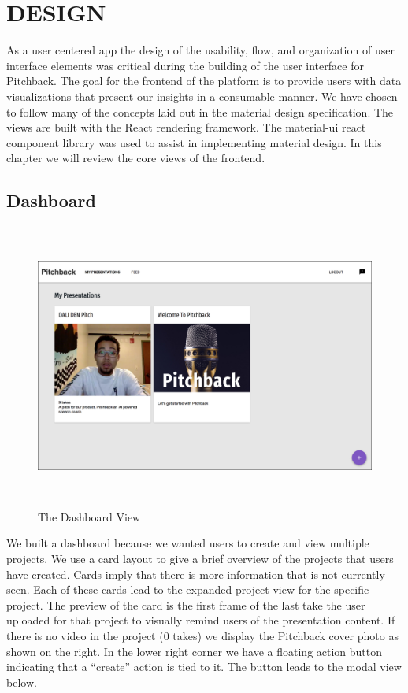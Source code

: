 \section*{DESIGN} \label{chapterdesign}

As a user centered app the design of the usability, flow, and organization of
user interface elements was critical during the building of the user interface
for Pitchback. The goal for the frontend of the platform is to provide users
with data visualizations that present our insights in a consumable manner. We
have chosen to follow many of the concepts laid out in the material design
\citep{material} specification. The views are built with the React rendering
framework. The material-ui \citep{materialui} react component library was used
to assist in implementing material design. In this chapter we will review the
core views of the frontend.

\subsection*{Dashboard}

\begin{figure}[H]
  \centering
   \includegraphics[height=3.7in]{figures/dashboard}
   \caption{The Dashboard View}
\end{figure}

We built a dashboard because we wanted users to create and view multiple
projects. We use a card layout to give a brief overview of the projects that
users have created. Cards imply that there is more information that is not
currently seen. Each of these cards lead to the expanded project view for the
specific project. The preview of the card is the first frame of the last take
the user uploaded for that project to visually remind users of the presentation
content. If there is no video in the project (0 takes) we display the Pitchback
cover photo as shown on the right. In the lower right corner we have a floating
action button indicating that a “create” action is tied to it. The button leads
to the modal view below.

